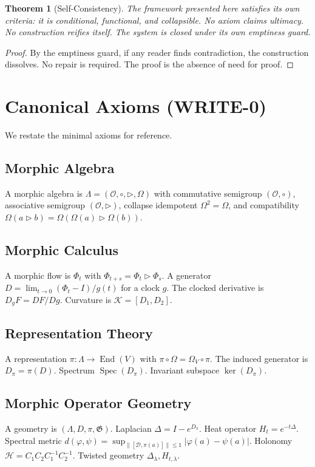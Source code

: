 \documentclass[12pt, oneside]{article}
\newtheorem{theorem}{Theorem}[section]
\DeclareMathOperator{\Spec}{Spec}
\DeclareMathOperator{\End}{End}
\begin{document}
\begin{theorem}[Self-Consistency]
The framework presented here satisfies its own criteria: it is conditional, functional, and collapsible. No axiom claims ultimacy. No construction reifies itself. The system is closed under its own emptiness guard.
\end{theorem}

\begin{proof}
By the emptiness guard, if any reader finds contradiction, the construction dissolves. No repair is required. The proof is the absence of need for proof.
\end{proof}

\appendix
\section{Canonical Axioms (WRITE-0)}

We restate the minimal axioms for reference.

\subsection{Morphic Algebra}
A morphic algebra is $\Lambda = (\mathcal{O}, \circ, \triangleright, \Omega)$ with commutative semigroup $(\mathcal{O},\circ)$, associative semigroup $(\mathcal{O},\triangleright)$, collapse idempotent $\Omega^2=\Omega$, and compatibility $\Omega(a \triangleright b) = \Omega(\Omega(a) \triangleright \Omega(b))$.

\subsection{Morphic Calculus}
A morphic flow is $\Phi_t$ with $\Phi_{t+s} = \Phi_t \triangleright \Phi_s$. A generator $D = \lim_{t\to 0} (\Phi_t - I)/g(t)$ for a clock $g$. The clocked derivative is $D_g F = DF/Dg$. Curvature is $\mathcal{K} = [D_1, D_2]$.

\subsection{Representation Theory}
A representation $\pi: \Lambda \to \End(V)$ with $\pi \circ \Omega = \Omega_V \circ \pi$. The induced generator is $D_\pi = \pi(D)$. Spectrum $\Spec(D_\pi)$. Invariant subspace $\ker(D_\pi)$.

\subsection{Morphic Operator Geometry}
A geometry is $(\Lambda, D, \pi, \mathfrak{G})$. Laplacian $\Delta = I - e^{D_\pi}$. Heat operator $H_t = e^{-t\Delta}$. Spectral metric $d(\varphi,\psi) = \sup_{\|[\mathcal{D}, \pi(a)]\|\le 1} |\varphi(a)-\psi(a)|$. Holonomy $\mathcal{H} = C_1 C_2 C_1^{-1} C_2^{-1}$. Twisted geometry $\Delta_\lambda, H_{t,\lambda}$.
\end{document}

